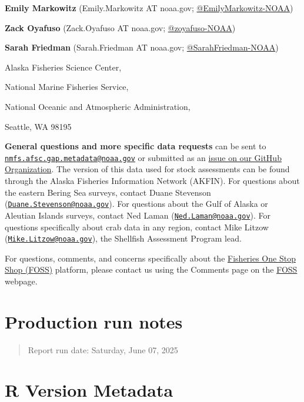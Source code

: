 \documentclass[
  letterpaper,
  oneside,
  open=any]{scrbook}
\begin{document}

\textbf{Emily Markowitz} (Emily.Markowitz AT noaa.gov;
\href{https://github.com/EmilyMarkowitz-NOAA}{@EmilyMarkowitz-NOAA})

\textbf{Zack Oyafuso} (Zack.Oyafuso AT noaa.gov;
\href{https://github.com/zoyafuso-NOAA}{@zoyafuso-NOAA})

\textbf{Sarah Friedman} (Sarah.Friedman AT noaa.gov;
\href{https://github.com/SarahFriedman-NOAA}{@SarahFriedman-NOAA})

Alaska Fisheries Science Center,

National Marine Fisheries Service,

National Oceanic and Atmospheric Administration,

Seattle, WA 98195

\textbf{General questions and more specific data requests} can be sent
to
\href{mailto:nmfs.afsc.gap.metadata@noaa.gov}{\nolinkurl{nmfs.afsc.gap.metadata@noaa.gov}}
or submitted as an
\href{https://github.com/afsc-gap-products/data-requests}{issue on our
GitHub Organization}. The version of this data used for stock
assessments can be found through the Alaska Fisheries Information
Network (AKFIN). For questions about the eastern Bering Sea surveys,
contact Duane Stevenson
(\href{mailto:Duane.Stevenson@noaa.gov}{\nolinkurl{Duane.Stevenson@noaa.gov}}).
For questions about the Gulf of Alaska or Aleutian Islands surveys,
contact Ned Laman
(\href{mailto:Ned.Laman@noaa.gov}{\nolinkurl{Ned.Laman@noaa.gov}}). For
questions specifically about crab data in any region, contact Mike
Litzow
(\href{mailto:Mike.Litzow@noaa.gov}{\nolinkurl{Mike.Litzow@noaa.gov}}),
the Shellfish Assessment Program lead.

For questions, comments, and concerns specifically about the
\href{https://www.fisheries.noaa.gov/foss}{Fisheries One Stop Shop
(FOSS)} platform, please contact us using the Comments page on the
\href{https://www.fisheries.noaa.gov/foss}{FOSS} webpage.

\chapter{Production run notes}\label{production-run-notes}

\begin{quote}
Report run date: Saturday, June 07, 2025
\end{quote}

\chapter{R Version Metadata}\label{r-version-metadata}
\end{document}
